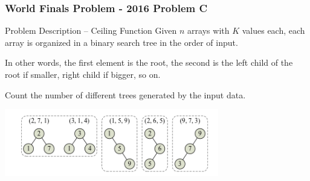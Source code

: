 \documentclass{beamer}
\begin{document}
\begin{frame}
  \frametitle{World Finals Problem - 2016 Problem C}
  {\smaller
  \begin{block}{Problem Description -- Ceiling Function}
    Given $n$ arrays with $K$ values each, each array 
    is organized in a binary search tree in the order of input. 

    \bigskip
    
    In other words, the first element is the root, the second
    is the left child of the root if smaller, right child if bigger, 
    so on.

    \bigskip

    Count the number of different trees generated by the input data.    
  \end{block}

  \begin{center}
    \includegraphics[width=0.7\textwidth]{../img/worldfinal2016}
  \end{center}

  }
\end{frame}
\end{document}
